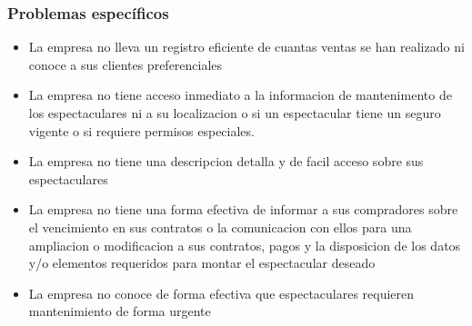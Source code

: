 \subsubsection{Problemas específicos}

\begin{itemize} %
	\item La empresa no lleva un registro eficiente de cuantas ventas se han realizado ni conoce a sus clientes preferenciales
	\item La empresa no tiene acceso inmediato a la informacion de mantenimento de los espectaculares ni a su localizacion o si un espectacular tiene un seguro vigente  o si requiere permisos especiales.
	\item La empresa no tiene una descripcion detalla y de facil acceso sobre sus espectaculares 
	\item La empresa no tiene una forma efectiva de informar a sus compradores sobre el vencimiento en sus contratos o la comunicacion con ellos para una ampliacion o modificacion a sus contratos, pagos y la disposicion de los datos y/o elementos requeridos para montar el espectacular deseado
	\item La empresa no conoce de forma efectiva que espectaculares requieren mantenimiento de forma urgente 
\end{itemize}